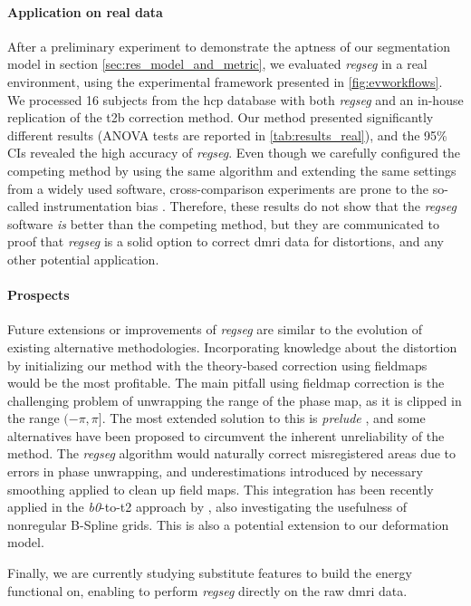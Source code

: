 \paragraph*{Application on real data}
After a preliminary experiment to demonstrate the aptness of our segmentation model
  in section \autoref{sec:res_model_and_metric}, we evaluated \emph{regseg} in
  a real environment, using the experimental framework presented in \autoref{fig:evworkflows}.
We processed 16 subjects from the \gls*{hcp} database with both \emph{regseg}
  and an in-house replication of the \gls*{t2b} correction method.
Our method presented significantly different results (ANOVA tests are reported in
  \autoref{tab:results_real}), and the 95\% CIs revealed the high accuracy of
  \emph{regseg}.
Even though we carefully configured the competing method by using the same algorithm and
  extending the same settings from a widely used software, cross-comparison
  experiments are prone to the so-called instrumentation bias \citep{tustison_instrumentation_2013}.
Therefore, these results do not show that the \emph{regseg} software \emph{is} better than the
  competing method, but they are communicated to proof that \emph{regseg} is a solid option to
  correct \gls*{dmri} data for distortions, and any other potential application.

\paragraph*{Prospects}
Future extensions or improvements of \emph{regseg} are similar to the evolution of existing
  alternative methodologies.
Incorporating knowledge about the distortion by initializing our method with the theory-based
  correction using fieldmaps would be the most profitable.
The main pitfall using fieldmap correction is the challenging problem of unwrapping the
  range of the phase map, as it is clipped in the range $(-\pi, \pi]$.
The most extended solution to this is \emph{prelude} \citep{jenkinson_fast_2003}, and some
  alternatives have been proposed \citep{zhou_reliable_2009,daga_susceptibility_2014} to
  circumvent the inherent unreliability of the method.
The \emph{regseg} algorithm would naturally correct misregistered areas due to errors in
  phase unwrapping, and underestimations introduced by necessary smoothing
  applied to clean up field maps.
This integration has been recently applied in the \emph{b0}-to-\gls*{t2} approach
  by \cite{irfanoglu_susceptibility_2011}, also investigating the usefulness of
  nonregular B-Spline grids.
This is also a potential extension to our deformation model.

Finally, we are currently studying substitute features to build the energy functional on,
  enabling to perform \emph{regseg} directly on the raw \gls*{dmri} data.